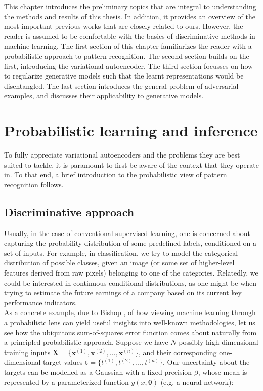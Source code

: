 \documentclass{report}
\begin{document}
This chapter introduces the preliminary topics that are integral to understanding the methods and results of this thesis. In addition, it provides an overview of the most important previous works that are closely related to ours. However, the reader is assumed to be comfortable with the basics of discriminative methods in machine learning. The first section of this chapter familiarizes the reader with a probabilistic approach to pattern recognition. The second section builds on the first, introducing the variational autoencoder. The third section focusses on how to regularize generative models such that the learnt representations would be disentangled. The last section introduces the general problem of adversarial examples, and discusses their applicability to generative models.

\section{Probabilistic learning and inference}

To fully appreciate variational autoencoders and the problems they are best suited to tackle, it is paramount to first be aware of the context that they operate in. To that end, a brief introduction to the probabilistic view of pattern recognition follows. \\

\subsection{Discriminative approach}

\noindent Usually, in the case of conventional supervised learning, one is concerned about capturing the probability distribution of some predefined labels, conditioned on a set of inputs. For example, in classification, we try to model the categorical distribution of possible classes, given an image (or some set of higher-level features derived from raw pixels) belonging to one of the categories. Relatedly, we could be interested in continuous conditional distributions, as one might be when trying to estimate the future earnings of a company based on its current key performance indicators. \\

\noindent As a concrete example, due to Bishop \cite{bishop-prml}, of how viewing machine learning through a probabilistc lens can yield useful insights into well-known methodologies, let us see how the ubiquitous sum-of-squares error function comes about naturally from a principled probabilistic approach. Suppose we have $N$ possibly high-dimensional training inputs $\mathbf{\boldsymbol{X}} = \{\boldsymbol{x}^{(1)}, \boldsymbol{x}^{(2)}, \dots, \boldsymbol{x}^{(n)}\}$, and their corresponding one-dimensional target values $\mathbf{t} = \{t^{(1)}, t^{(2)}, \dots, t^{(n)}\}$. Our uncertainty about the targets can be modelled as a Gaussian with a fixed precision $\beta$, whose mean is represented by a parameterized function $y(x, \boldsymbol{\theta})$ (e.g. a neural network):
\end{document}
